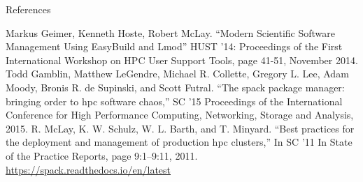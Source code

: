 \documentclass[final]{beamer}
\newlength{\onecolwid}
\begin{document}
\begin{frame}[t]
\begin{columns}[t]
\begin{column}{\onecolwid}
\begin{block}{References}

\nocite{*} %
\small{

\begin{thebibliography}{00}
 Markus Geimer, Kenneth Hoste, Robert McLay. ``Modern Scientific Software Management Using EasyBuild and Lmod'' HUST '14: Proceedings of the First International Workshop on HPC User Support Tools, page 41-51, November 2014.
 Todd Gamblin, Matthew LeGendre, Michael R. Collette, Gregory L. Lee, Adam Moody, Bronis R. de Supinski, and Scott Futral. ``The spack package manager: bringing order to hpc software chaos,'' SC ’15 Proceedings of the International Conference for High Performance Computing, Networking, Storage and Analysis, 2015.
 R. McLay, K. W. Schulz, W. L. Barth, and T. Minyard. ``Best practices for the deployment and management of production hpc clusters,'' In SC ’11 In State of the Practice Reports, page 9:1–9:11, 2011.
 \href{https://spack.readthedocs.io/en/latest}{https://spack.readthedocs.io/en/latest}
\end{thebibliography}
}

\end{block}



\end{column}
\end{columns}
\end{frame}
\end{document}
